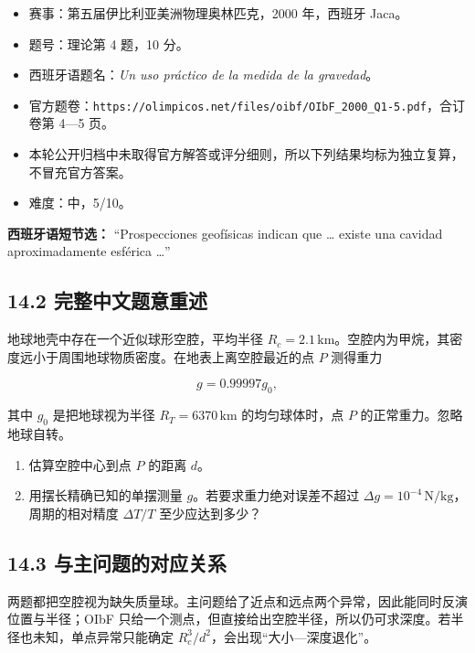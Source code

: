 \documentclass[
  11pt,
  UTF8]{ctexart}
\providecommand{\tightlist}{%
  \setlength{\itemsep}{0pt}\setlength{\parskip}{0pt}}
\begin{document}
\begin{itemize}
\tightlist
\item
  赛事：第五届伊比利亚美洲物理奥林匹克，2000 年，西班牙 Jaca。
\item
  题号：理论第 4 题，10 分。
\item
  西班牙语题名：\emph{Un uso práctico de la medida de la gravedad}。
\item
  官方题卷：\texttt{https://olimpicos.net/files/oibf/OIbF\_2000\_Q1-5.pdf}，合订卷第
  4---5 页。
\item
  本轮公开归档中未取得官方解答或评分细则，所以下列结果均标为独立复算，不冒充官方答案。
\item
  难度：中，5/10。
\end{itemize}

\textbf{西班牙语短节选：} ``Prospecciones geofísicas indican que
\ldots{} existe una cavidad aproximadamente esférica \ldots{}''

\hypertarget{ux5b8cux6574ux4e2dux6587ux9898ux610fux91cdux8ff0-1}{%
\subsection{14.2
完整中文题意重述}\label{ux5b8cux6574ux4e2dux6587ux9898ux610fux91cdux8ff0-1}}

地球地壳中存在一个近似球形空腔，平均半径
\(R_c=2.1\,\mathrm{km}\)。空腔内为甲烷，其密度远小于周围地球物质密度。在地表上离空腔最近的点
\(P\) 测得重力

\[g=0.99997g_0,\]

其中 \(g_0\) 是把地球视为半径 \(R_T=6370\,\mathrm{km}\) 的均匀球体时，点
\(P\) 的正常重力。忽略地球自转。

\begin{enumerate}
\def\labelenumi{\arabic{enumi}.}
\tightlist
\item
  估算空腔中心到点 \(P\) 的距离 \(d\)。
\item
  用摆长精确已知的单摆测量 \(g\)。若要求重力绝对误差不超过
  \(Δg=10^{-4}\,\mathrm{N/kg}\)，周期的相对精度 \(ΔT/T\)
  至少应达到多少？
\end{enumerate}

\hypertarget{ux4e0eux4e3bux95eeux9898ux7684ux5bf9ux5e94ux5173ux7cfb}{%
\subsection{14.3
与主问题的对应关系}\label{ux4e0eux4e3bux95eeux9898ux7684ux5bf9ux5e94ux5173ux7cfb}}

两题都把空腔视为缺失质量球。主问题给了近点和远点两个异常，因此能同时反演位置与半径；OIbF
只给一个测点，但直接给出空腔半径，所以仍可求深度。若半径也未知，单点异常只能确定
\(R_c^3/d^2\)，会出现``大小---深度退化''。
\end{document}
